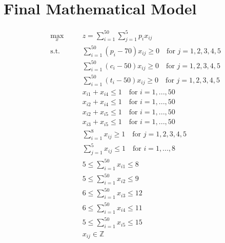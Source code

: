 \documentclass{article}
\begin{document}
\section{Final Mathematical Model}
\begin{equation}
    \begin{aligned}
        &\underset{x}{\text{max}}\nonumber\hspace{1em} && z = \sum_{i=1}^{50}\sum_{j=1}^{5} p_ix_{ij}\\
        &\text{s.t.} & &  \sum_{i=1}^{50} (p_i-70)x_{ij} \ge 0 \hspace{1em}\text{for $j = 1,2,3,4,5$}\\
        & & &  \sum_{i=1}^{50} (c_i-50)x_{ij} \ge 0 \hspace{1em}\text{for $j = 1,2,3,4,5$} \\
        &&& \sum_{i=1}^{50} (t_i-50)x_{ij} \ge 0 \hspace{1em}\text{for $j = 1,2,3,4,5$}\\
        &&& x_{i1} + x_{i4} \le 1 \hspace{1em}\text{for $i = 1,..., 50$}\\
        &&& x_{i2} + x_{i4} \le 1 \hspace{1em}\text{for $i = 1,..., 50$}\\
        &&& x_{i2} + x_{i5} \le 1 \hspace{1em}\text{for $i = 1,..., 50$}\\
        &&& x_{i3} + x_{i5} \le 1 \hspace{1em}\text{for $i = 1,..., 50$}\\
        &&& \sum_{i=1}^{8} x_{ij} \ge 1 \hspace{1em}\text{for $j = 1,2,3,4,5$}\\
        &&& \sum_{j=1}^{5} x_{ij} \le 1 \hspace{1em}\text{for $i=1,..., 8$}\\
        &&& 5 \le \sum_{i=1}^{50} x_{i1} \le 8\\
        &&& 5 \le \sum_{i=1}^{50} x_{i2} \le 9\\
        &&& 6 \le \sum_{i=1}^{50} x_{i3} \le 12\\
        &&& 6 \le \sum_{i=1}^{50} x_{i4} \le 11\\
        &&& 5 \le \sum_{i=1}^{50} x_{i5} \le 15\\
        &&&  x_{ij} \in \mathbb{Z}\\
    \end{aligned}
\end{equation}
\pagebreak
\end{document}
